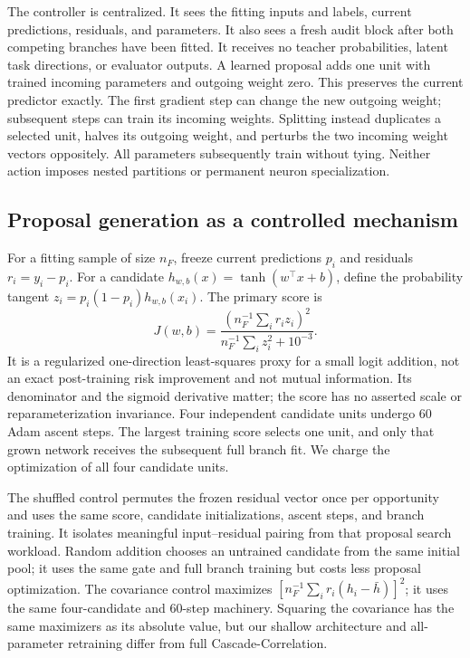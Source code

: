 \documentclass[11pt]{article}
\theoremstyle{remark}\newtheorem{remark}[theorem]{Remark}
\begin{document}
The controller is centralized. It sees the fitting inputs and labels,
current predictions, residuals, and parameters. It also sees a fresh audit
block after both competing branches have been fitted. It receives no teacher
probabilities, latent task directions, or evaluator outputs. A learned
proposal adds one unit with trained incoming parameters and outgoing weight
zero. This preserves the current predictor exactly. The first gradient step
can change the new outgoing weight; subsequent steps can train its incoming
weights. Splitting instead duplicates a selected unit, halves its outgoing
weight, and perturbs the two incoming weight vectors oppositely. All
parameters subsequently train without tying. Neither action imposes nested
partitions or permanent neuron specialization.

\subsection{Proposal generation as a controlled mechanism}
For a fitting sample of size $n_F$, freeze current predictions $p_i$ and
residuals $r_i=y_i-p_i$. For a candidate $h_{w,b}(x)=\tanh(w^\top x+b)$,
define the probability tangent $z_i=p_i(1-p_i)h_{w,b}(x_i)$. The primary
score is
\begin{equation}
 J(w,b)=\frac{(n_F^{-1}\sum_i r_i z_i)^2}
                   {n_F^{-1}\sum_i z_i^2+10^{-3}}.
 \label{eq:proposal-score}
\end{equation}
It is a regularized one-direction least-squares proxy for a small logit
addition, not an exact post-training risk improvement and not mutual
information. Its denominator and the sigmoid derivative matter; the score
has no asserted scale or reparameterization invariance. Four independent
candidate units undergo 60 Adam ascent steps. The largest training score
selects one unit, and only that grown network receives the subsequent full
branch fit. We charge the optimization of all four candidate units.

The shuffled control permutes the frozen residual vector once per opportunity
and uses the same score, candidate initializations, ascent steps, and branch
training. It isolates meaningful input--residual pairing from that proposal
search workload. Random addition chooses an untrained candidate from the same
initial pool; it uses the same gate and full branch training but costs less
proposal optimization. The covariance control maximizes
$[n_F^{-1}\sum_i r_i(h_i-\bar h)]^2$; it uses the same four-candidate and
60-step machinery. Squaring the covariance has the same maximizers as its
absolute value, but our shallow architecture and all-parameter retraining
differ from full Cascade-Correlation.
\end{document}
